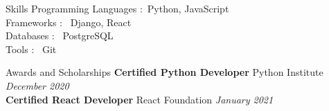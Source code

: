\documentclass{resume} %
\begin{document}
                        \begin{rSection}{Skills}
                        {Programming Languages :}\
Python, JavaScript \\ 
{Frameworks : }\
Django, React \\ 
{Databases : }\
PostgreSQL \\ 
{Tools : }\
Git \\
                        \end{rSection}

                        \begin{rSection}{Awards and Scholarships}
                        {\bf Certified Python Developer} \hfill Python Institute \hfill {\em December 2020} \\ 
{\bf Certified React Developer} \hfill React Foundation \hfill {\em January 2021} \\ 

                        \end{rSection}

                        
\end{document}
